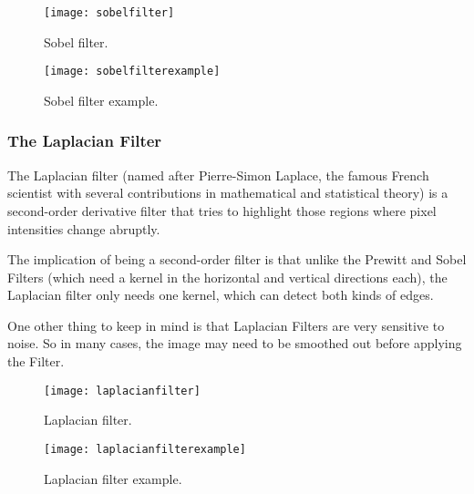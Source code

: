 	\begin{figure}[htb]
		\centering
		\texttt{[image: sobelfilter]}
		\caption[Sobel filter]{Sobel filter.}
		\label{fig:sobelfilter}
	\end{figure}
	\begin{figure}[htb]
		\centering
		\texttt{[image: sobelfilterexample]}
		\caption[Sobel filter example]{Sobel filter example.}
		\label{fig:sobelfileterexample}
	\end{figure}


	\subsubsection{The Laplacian Filter}
	\begin{bulletedlist}
		\item The Laplacian filter (named after Pierre-Simon Laplace, the famous French scientist with several contributions in mathematical and statistical theory) is a second-order derivative filter that tries to highlight those regions where pixel intensities change abruptly.
		\item The implication of being a second-order filter is that unlike the Prewitt and Sobel Filters (which need a kernel in the horizontal and vertical directions each), the Laplacian filter only needs one kernel, which can detect both kinds of edges.
		\item One other thing to keep in mind is that Laplacian Filters are very sensitive to noise. So in many cases, the image may need to be smoothed out before applying the Filter.
	\end{bulletedlist}

	\begin{figure}[htb]
		\centering
		\texttt{[image: laplacianfilter]}
		\caption[Laplacian filter]{Laplacian filter.}
		\label{fig:laplacianfilter}
	\end{figure}
	\begin{figure}[htb]
		\centering
		\texttt{[image: laplacianfilterexample]}
		\caption[Laplacian filter example]{Laplacian filter example.}
		\label{fig:laplacianfilterexample}
	\end{figure}


